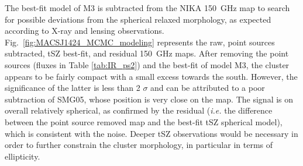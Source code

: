 \documentclass[twocolumn,traditabstract]{aa}
\begin{document}
The best-fit model of M3 is subtracted from the NIKA 150~GHz map to search for possible deviations from the spherical relaxed morphology, as expected according to X-ray and lensing observations. Fig.~\ref{fig:MACSJ1424_MCMC_modeling} represents the raw, point sources subtracted, tSZ best-fit, and residual 150~GHz maps. After removing the point sources (fluxes in Table \ref{tab:IR_ps2}) and the best-fit of model M3, the cluster appears to be fairly compact with a small excess towards the south. However, the significance of the latter is less than 2 $\sigma$ and can be attributed to a poor subtraction of SMG05, whose position is very close on the map. The signal is on overall relatively spherical, as confirmed by the residual ({\it i.e.} the difference between the point source removed map and the best-fit tSZ spherical model), which is consistent with the noise. Deeper tSZ observations would be necessary in order to further constrain the cluster morphology, in particular in terms of ellipticity.
\end{document}
